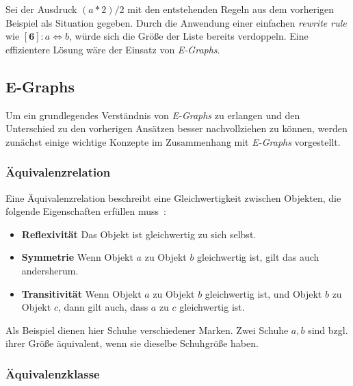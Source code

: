 Sei der Ausdruck $(a * 2) / 2$ mit den entstehenden Regeln aus dem vorherigen Beispiel als Situation gegeben. Durch die Anwendung einer einfachen \textit{rewrite rule} wie 
$[\mathbf{6}]: a \Leftrightarrow b$, würde sich die Größe der Liste bereits verdoppeln.
Eine effizientere Lösung wäre der Einsatz von \textit{E-Graphs}.


\subsection{E-Graphs}

Um ein grundlegendes Verständnis von \textit{E-Graphs} zu erlangen und den Unterschied zu den vorherigen Ansätzen besser nachvollziehen zu können,
werden zunächst einige wichtige Konzepte im Zusammenhang mit \textit{E-Graphs} vorgestellt. 

\subsubsection{Äquivalenzrelation}

Eine Äquivalenzrelation beschreibt eine Gleichwertigkeit zwischen Objekten, die folgende Eigenschaften erfüllen muss~\cite{Ehrig2001}:

\begin{itemize}
  \item \textbf{Reflexivität} Das Objekt ist gleichwertig zu sich selbst.
  \item \textbf{Symmetrie} Wenn Objekt $a$ zu Objekt $b$ gleichwertig ist, gilt das auch andersherum.
  \item \textbf{Transitivität} Wenn Objekt $a$ zu Objekt $b$ gleichwertig ist, und Objekt $b$ zu Objekt $c$, dann gilt auch, dass $a$ zu $c$ gleichwertig ist.
\end{itemize}

Als Beispiel dienen hier Schuhe verschiedener Marken. Zwei Schuhe $a, b$ sind bzgl. ihrer Größe äquivalent, wenn sie dieselbe Schuhgröße haben. 

\subsubsection{Äquivalenzklasse}

